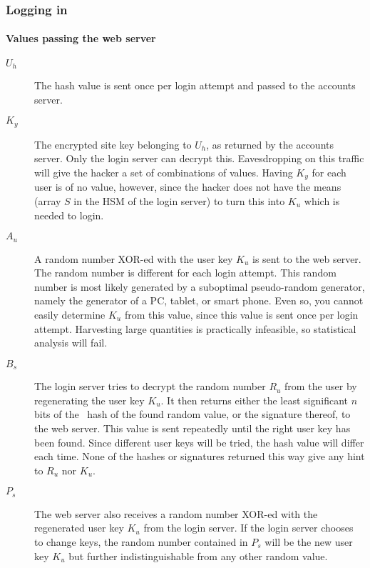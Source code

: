 \subsubsection{Logging in}
\paragraph{Values passing the web server}
\label{sec:passing_web server}
\begin{description}
\item[$U_h$]	The hash value is sent once per login attempt and passed to the accounts server.
\item[$K_y$]	The encrypted site key belonging to $U_h$,
				as returned by the accounts server.
				Only the login server can decrypt this.
				Eavesdropping on this traffic will give the hacker a set of combinations of values.
				Having $K_y$ for each user is of no value,
				however,
				since the hacker does not have the means
				(array $S$ in the HSM of the login server)
				to turn this into $K_u$ which is needed to login.
\item[$A_u$]	A random number XOR-ed with the user key $K_u$ is sent to the web server.
				The random number is different for each login attempt.
				This random number is most likely generated by a suboptimal pseudo-random generator,
				namely the generator of a PC, tablet, or smart phone.
				Even so, you cannot easily determine $K_u$ from this value,
				since this value is sent once per login attempt.
				Harvesting large quantities is practically infeasible,
				so statistical analysis will fail.
\item[$B_s$]	The login server tries to decrypt the random number $R_u$ from the user by regenerating the user key $K_u$.
				It then returns either the least significant $n$ bits of the \SHA\ hash of the found random value,
				or the signature thereof,
				to the web server.
				\newline
				This value is sent repeatedly until the right user key has been found.
				Since different user keys will be tried, the hash value will differ each time.
				None of the hashes or signatures returned this way give any hint to $R_u$ nor $K_u$.
\item[$P_s$]	The web server also receives a random number XOR-ed with the regenerated user key $K_u$ from the login server.
				If the login server chooses to change keys,
				the random number contained in $P_s$ will be the new user key $K_u$
				but further indistinguishable from any other random value.

\end{description}
